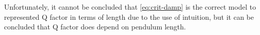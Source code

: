\documentclass[11pt]{article}
\begin{document}
\begin{multicols}{2}
{Unfortunately, it cannot be concluded that \ref{eq:crit-damp} is the correct model to represented Q factor in terms of length due to the use of intuition, but it can be concluded that Q factor does depend on pendulum length.
}

\newpage

\end{multicols}

\printbibliography[heading=bibintoc]

\newpage

\appendix


\end{document}
